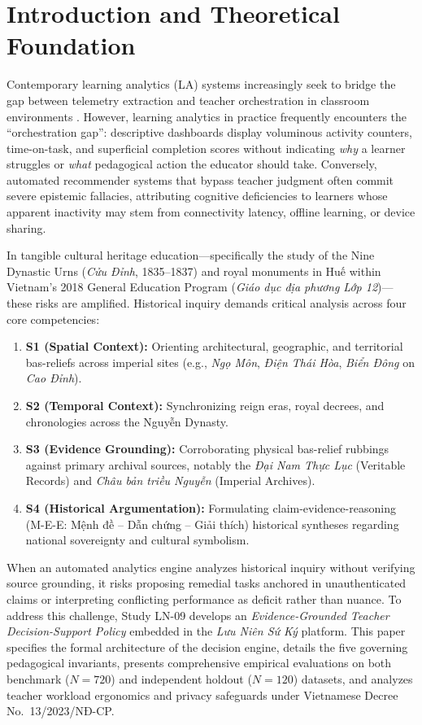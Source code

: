 \documentclass[11pt,a4paper]{article}
\begin{document}
\section{Introduction and Theoretical Foundation}
Contemporary learning analytics (LA) systems increasingly seek to bridge the gap between telemetry extraction and teacher orchestration in classroom environments \cite{vanleeuwen2021teacher,wise2021guiding}. However, learning analytics in practice frequently encounters the ``orchestration gap'': descriptive dashboards display voluminous activity counters, time-on-task, and superficial completion scores without indicating \textit{why} a learner struggles or \textit{what} pedagogical action the educator should take. Conversely, automated recommender systems that bypass teacher judgment often commit severe epistemic fallacies, attributing cognitive deficiencies to learners whose apparent inactivity may stem from connectivity latency, offline learning, or device sharing.

In tangible cultural heritage education—specifically the study of the Nine Dynastic Urns (\textit{Cửu Đỉnh}, 1835--1837) and royal monuments in Huế within Vietnam's 2018 General Education Program (\textit{Giáo dục địa phương Lớp 12})—these risks are amplified. Historical inquiry demands critical analysis across four core competencies:
\begin{enumerate}
    \item \textbf{S1 (Spatial Context):} Orienting architectural, geographic, and territorial bas-reliefs across imperial sites (e.g., \textit{Ngọ Môn}, \textit{Điện Thái Hòa}, \textit{Biển Đông} on \textit{Cao Đỉnh}).
    \item \textbf{S2 (Temporal Context):} Synchronizing reign eras, royal decrees, and chronologies across the Nguyễn Dynasty.
    \item \textbf{S3 (Evidence Grounding):} Corroborating physical bas-relief rubbings against primary archival sources, notably the \textit{Đại Nam Thực Lục} (Veritable Records) and \textit{Châu bản triều Nguyễn} (Imperial Archives).
    \item \textbf{S4 (Historical Argumentation):} Formulating claim-evidence-reasoning (M-E-E: Mệnh đề -- Dẫn chứng -- Giải thích) historical syntheses regarding national sovereignty and cultural symbolism.
\end{enumerate}

When an automated analytics engine analyzes historical inquiry without verifying source grounding, it risks proposing remedial tasks anchored in unauthenticated claims or interpreting conflicting performance as deficit rather than nuance. 
To address this challenge, Study LN-09 develops an \textit{Evidence-Grounded Teacher Decision-Support Policy} embedded in the \textit{Lưu Niên Sứ Ký} platform. This paper specifies the formal architecture of the decision engine, details the five governing pedagogical invariants, presents comprehensive empirical evaluations on both benchmark ($N=720$) and independent holdout ($N=120$) datasets, and analyzes teacher workload ergonomics and privacy safeguards under Vietnamese Decree No.~13/2023/NĐ-CP.
\end{document}
